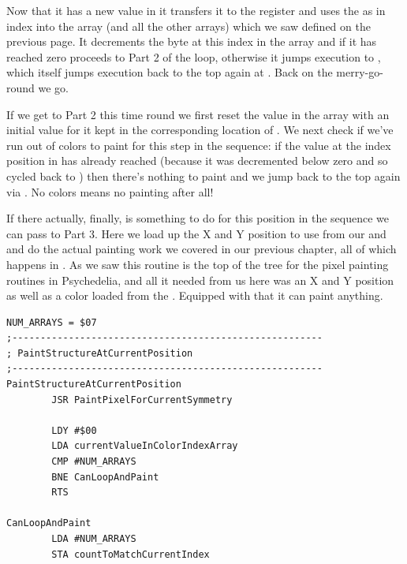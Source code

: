 {Now that it has a new value in  it transfers it to the  register and uses the 
 as in index into the  array (and all the other arrays) which we saw defined on the previous 
page. It decrements the byte at this index in the  array and if it has reached zero
proceeds to Part 2 of the loop, otherwise it jumps execution to , which itself jumps execution
back to the top again at . Back on the merry-go-round we go.

If we get to Part 2 this time round we first reset the value in the  array with an initial value for it kept in the corresponding
location of . We next check if we've run out of colors to paint for this step
in the sequence: if the value at the index position in  has already reached  (because
it was decremented below zero and so cycled back to ) then there's nothing to paint and we jump back to the top
again via . No colors means no painting after all!

If there actually, finally, is something to do for this position in the sequence we can pass to Part 3. Here we load up the X and Y
position to use from our  and  and do the actual painting work we covered
in our previous chapter, all of which happens in . As we saw this routine is the top of the
tree for the pixel painting routines in Psychedelia, and all it needed from us here was an X and Y position as well as a color
loaded from the . Equipped with that it can paint anything. 

\clearpage
\begin{lstlisting}[caption = The routine responsible for orchestrating the pattern painting.]
NUM_ARRAYS = $07
;-------------------------------------------------------
; PaintStructureAtCurrentPosition
;-------------------------------------------------------
PaintStructureAtCurrentPosition   
        JSR PaintPixelForCurrentSymmetry

        LDY #$00
        LDA currentValueInColorIndexArray
        CMP #NUM_ARRAYS
        BNE CanLoopAndPaint
        RTS 

CanLoopAndPaint   
        LDA #NUM_ARRAYS
        STA countToMatchCurrentIndex
       

\end{lstlisting}}
